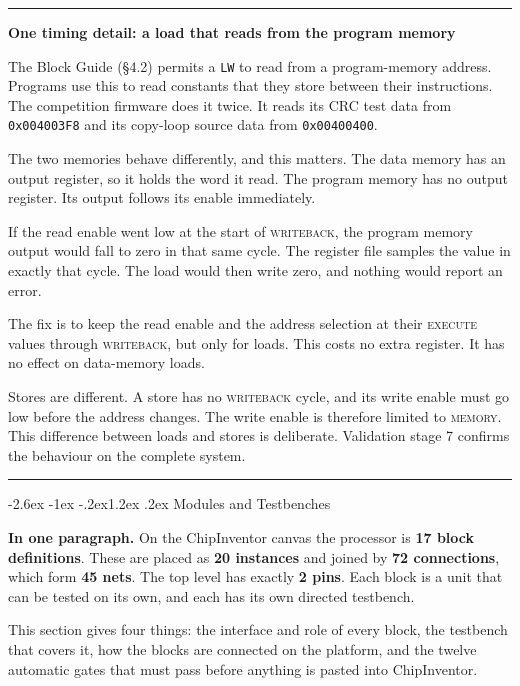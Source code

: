 \documentclass[11pt,a4paper]{article}
\makeatletter
\renewcommand\section{\@startsection{section}{1}{\z@}%
  {-2.6ex \@plus -1ex \@minus -.2ex}{1.2ex \@plus.2ex}%
  {\color{rvbl}\normalfont\large\bfseries}}
\newenvironment{callout}[1]{%
  \par\penalty-150\vspace{6pt}%
  \begin{center}\begin{minipage}{0.965\linewidth}%
  \textcolor{rvbl}{\rule{\linewidth}{0.9pt}}\par\vspace{1pt}%
  {\color{rvbl}\bfseries #1}\par\vspace{2pt}\small\ignorespaces}%
 {\par\vspace{3pt}\textcolor{rvbl}{\rule{\linewidth}{0.9pt}}%
  \end{minipage}\end{center}\vspace{4pt}\par}
\makeatother
\begin{document}
\begin{callout}{One timing detail: a load that reads from the program memory}
The Block Guide (\S4.2) permits a \texttt{LW} to read from a program-memory address. Programs
use this to read constants that they store between their instructions. The competition
firmware does it twice. It reads its CRC test data from \texttt{0x004003F8} and its copy-loop
source data from \texttt{0x00400400}.

The two memories behave differently, and this matters. The data memory has an output
register, so it holds the word it read. The program memory has no output register. Its
output follows its enable immediately.

If the read enable went low at the start of \textsc{writeback}, the program memory output
would fall to zero in that same cycle. The register file samples the value in exactly that
cycle. The load would then write zero, and nothing would report an error.

The fix is to keep the read enable and the address selection at their \textsc{execute}
values through \textsc{writeback}, but only for loads. This costs no extra register. It has
no effect on data-memory loads.

Stores are different. A store has no \textsc{writeback} cycle, and its write enable must go
low before the address changes. The write enable is therefore limited to \textsc{memory}.
This difference between loads and stores is deliberate. Validation stage 7 confirms the
behaviour on the complete system.
\end{callout}


\section{Modules and Testbenches}
\label{sec:modules}

\textbf{In one paragraph.} On the ChipInventor canvas the processor is
\textbf{17 block definitions}. These are placed as \textbf{20 instances} and joined by
\textbf{72 connections}, which form \textbf{45 nets}. The top level has exactly
\textbf{2 pins}. Each block is a unit that can be tested on its own, and each has its own
directed testbench.

This section gives four things: the interface and role of every block, the testbench that
covers it, how the blocks are connected on the platform, and the twelve automatic gates that
must pass before anything is pasted into ChipInventor.
\end{document}
